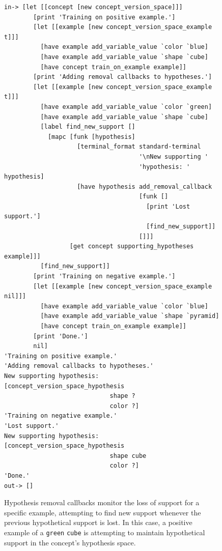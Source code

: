 \begin{figure}[h]
\centering
{\scriptsize
\begin{Verbatim}[frame=single]
 in-> [let [[concept [new concept_version_space]]]
        [print 'Training on positive example.']
        [let [[example [new concept_version_space_example t]]]
          [have example add_variable_value `color `blue]
          [have example add_variable_value `shape `cube]
          [have concept train_on_example example]]
        [print 'Adding removal callbacks to hypotheses.']
        [let [[example [new concept_version_space_example t]]]
          [have example add_variable_value `color `green]
          [have example add_variable_value `shape `cube]
          [label find_new_support []
            [mapc [funk [hypothesis]
                    [terminal_format standard-terminal
                                     '\nNew supporting '
                                     'hypothesis: ' hypothesis]
                    [have hypothesis add_removal_callback
                                     [funk []
                                       [print 'Lost support.']
                                       [find_new_support]]
                                     []]]
                  [get concept supporting_hypotheses example]]]
          [find_new_support]]
        [print 'Training on negative example.']
        [let [[example [new concept_version_space_example nil]]]
          [have example add_variable_value `color `blue]
          [have example add_variable_value `shape `pyramid]
          [have concept train_on_example example]]
        [print 'Done.']
        nil]
'Training on positive example.'
'Adding removal callbacks to hypotheses.'
New supporting hypothesis: [concept_version_space_hypothesis
                             shape ?
                             color ?]
'Training on negative example.'
'Lost support.'
New supporting hypothesis: [concept_version_space_hypothesis
                             shape cube
                             color ?]
'Done.'
out-> []
\end{Verbatim}
}
\caption[Hypothesis removal callbacks used to monitor the loss of
  support for a specific example, attempting to find new support
  whenever the previous hypothetical support is lost.]{Hypothesis
  removal callbacks monitor the loss of support for a specific
  example, attempting to find new support whenever the previous
  hypothetical support is lost.  In this case, a positive example of a
  {\tt{green}} {\tt{cube}} is attempting to maintain hypothetical
  support in the concept's hypothesis space.}
\label{figure:concept_version_space_hypothetical_support}
\end{figure}


